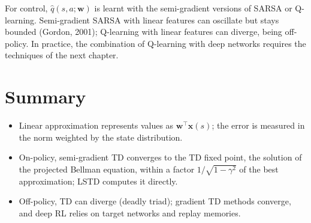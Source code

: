 For control, $\hat q(s, a; \mathbf{w})$ is learnt with the semi-gradient
versions of SARSA or Q-learning. Semi-gradient SARSA with linear features
can oscillate but stays bounded (Gordon, 2001); Q-learning with linear
features can diverge, being off-policy. In practice, the combination of
Q-learning with deep networks requires the techniques of the next chapter.

\section{Summary}

\begin{itemize}[nosep]
  \item Linear approximation represents values as $\mathbf{w}^\top
    \mathbf{x}(s)$; the error is measured in the norm weighted by the
    state distribution.
  \item On-policy, semi-gradient TD converges to the TD fixed point, the
    solution of the projected Bellman equation, within a factor $1 /
    \sqrt{1 - \gamma^2}$ of the best approximation; LSTD computes it
    directly.
  \item Off-policy, TD can diverge (deadly triad); gradient TD methods
    converge, and deep RL relies on target networks and replay memories.
\end{itemize}
